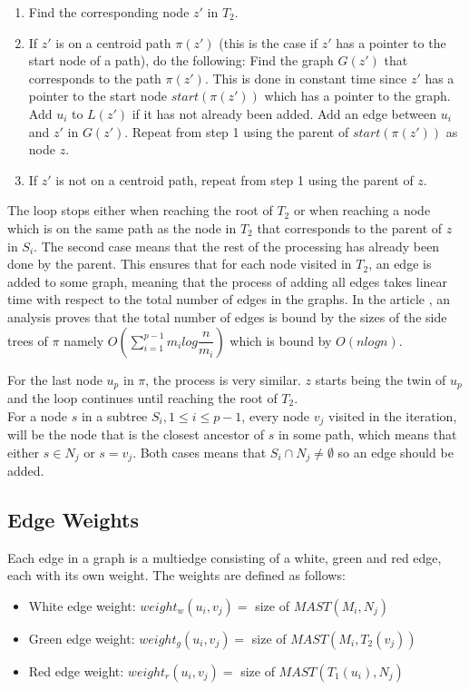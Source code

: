 \begin{enumerate}
	\item Find the corresponding node $z'$ in $T_2$.
	\item If $z'$ is on a centroid path $\pi(z')$ (this is the case if $z'$ has a pointer to the start node of a path), do the following:
	\subitem Find the graph $G(z')$ that corresponds to the path $\pi(z')$. This is done in constant time since $z'$ has a pointer to the start node $start(\pi(z'))$ which has a pointer to the graph.
	\subitem Add $u_i$ to $L(z')$ if it has not already been added.
	\subitem Add an edge between $u_i$ and $z'$ in $G(z')$.
	\subitem Repeat from step 1 using the parent of $start(\pi(z'))$ as node $z$.
	\item If $z'$ is not on a centroid path, repeat from step 1 using the parent of $z$.
\end{enumerate}
The loop stops either when reaching the root of $T_2$ or when reaching a node which is on the same path as the node in $T_2$ that corresponds to the parent of $z$ in $S_i$. The second case means that the rest of the processing has already been done by the parent. This ensures that for each node visited in $T_2$, an edge is added to some graph, meaning that the process of adding all edges takes linear time with respect to the total number of edges in the graphs. In the article \cite{nlogn}, an analysis proves that the total number of edges is bound by the sizes of the side trees of $\pi$ namely $O(\sum_{i=1}^{p-1}m_ilog\dfrac{n}{m_i})$ which is bound by $O(nlogn)$.

For the last node $u_p$ in $\pi$, the process is very similar. $z$ starts being the twin of $u_p$ and the loop continues until reaching the root of $T_2$.\\

For a node $s$ in a subtree $S_i, 1 \le i \le p-1$, every node $v_j$ visited in the iteration, will be the node that is the closest ancestor of $s$ in some path, which means that either $s \in N_j$ or $s=v_j$. Both cases means that $S_i \cap N_j \ne \emptyset$ so an edge should be added.

\subsection{Edge Weights}
Each edge in a graph is a multiedge consisting of a white, green and red edge, each with its own weight. The weights are defined as follows:
\begin{itemize}
	\item White edge weight: $weight_w(u_i, v_j)=$ size of $MAST(M_i,N_j)$
	\item Green edge weight: $weight_g(u_i, v_j)=$ size of $MAST(M_i,T_2(v_j))$
	\item Red edge weight: $weight_r(u_i, v_j)=$ size of $MAST(T_1(u_i),N_j)$
\end{itemize}

